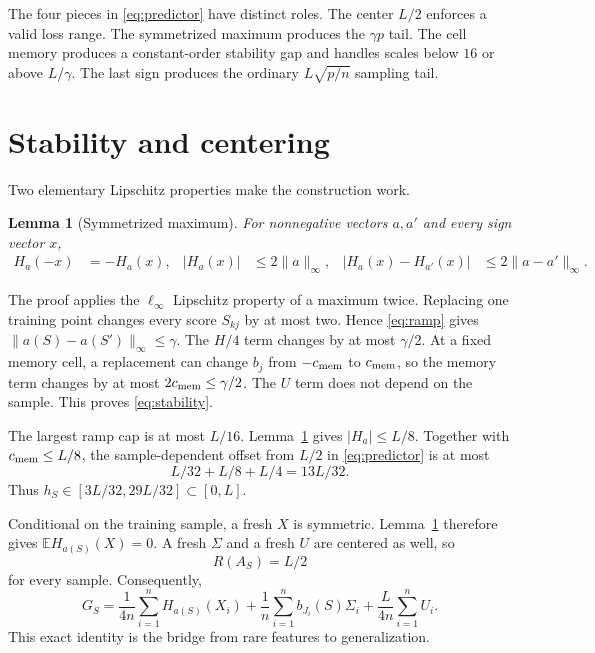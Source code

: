 \documentclass{article}
\newtheorem{lemma}[theorem]{Lemma}
\newcommand{\E}{\mathbb E}
\newcommand{\1}{\mathbf 1}
\begin{document}
The four pieces in \eqref{eq:predictor} have distinct roles. The center $L/2$ enforces a valid loss range. The symmetrized maximum produces the $\gamma p$ tail. The cell memory produces a constant-order stability gap and handles scales below $16$ or above $L/\gamma$. The last sign produces the ordinary $L\sqrt{p/n}$ sampling tail.

\section{Stability and centering}

Two elementary Lipschitz properties make the construction work.

\begin{lemma}[Symmetrized maximum]\label{lem:H}
For nonnegative vectors $a,a'$ and every sign vector $x$,
\begin{align}
 H_a(-x)&=-H_a(x),
 &|H_a(x)|&\le2\|a\|_\infty,
 &|H_a(x)-H_{a'}(x)|&\le2\|a-a'\|_\infty.
 \label{eq:H-properties}
\end{align}
\end{lemma}

The proof applies the $\ell_\infty$ Lipschitz property of a maximum twice. Replacing one training point changes every score $S_{kj}$ by at most two. Hence \eqref{eq:ramp} gives $\|a(S)-a(S')\|_\infty\le\gamma$. The $H/4$ term changes by at most $\gamma/2$. At a fixed memory cell, a replacement can change $b_j$ from $-c_{\rm mem}$ to $c_{\rm mem}$, so the memory term changes by at most $2c_{\rm mem}\le\gamma/2$. The $U$ term does not depend on the sample. This proves \eqref{eq:stability}.

The largest ramp cap is at most $L/16$. Lemma~\ref{lem:H} gives $|H_a|\le L/8$. Together with $c_{\rm mem}\le L/8$, the sample-dependent offset from $L/2$ in \eqref{eq:predictor} is at most \[ L/32+L/8+L/4=13L/32. \] Thus $h_S\in[3L/32,29L/32]\subset[0,L]$.

Conditional on the training sample, a fresh $X$ is symmetric. Lemma~\ref{lem:H} therefore gives $\E H_{a(S)}(X)=0$. A fresh $\Sigma$ and a fresh $U$ are centered as well, so
\begin{equation}
 R(A_S)=L/2
 \label{eq:population-half}
\end{equation}
for every sample. Consequently,
\begin{equation}
 G_S=\frac1{4n}\sum_{i=1}^nH_{a(S)}(X_i)
 +\frac1n\sum_{i=1}^nb_{J_i}(S)\Sigma_i
 +\frac{L}{4n}\sum_{i=1}^nU_i.
 \label{eq:gap-decomp}
\end{equation}
This exact identity is the bridge from rare features to generalization.
\end{document}
